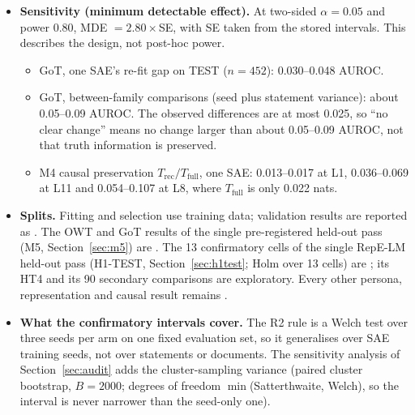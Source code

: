 \begin{itemize}
        excludes zero. No correction across cells is part of the rule; an approximate post-hoc Holm correction is
        reported alongside (Section~\ref{sec:pcacm}).
  \item \textbf{Sensitivity (minimum detectable effect).} At two-sided $\alpha=0.05$ and power 0.80,
        MDE $=2.80\times$SE, with SE taken from the stored intervals. This describes the design, not post-hoc power.
        \begin{itemize}
        \item GoT, one SAE's re-fit gap on TEST ($n=452$): 0.030--0.048 AUROC.
        \item GoT, between-family comparisons (seed plus statement variance): about 0.05--0.09 AUROC. The observed
          differences are at most 0.025, so ``no clear change'' means no change larger than about 0.05--0.09 AUROC,
          not that truth information is preserved.
        \item M4 causal preservation $T_{\text{rec}}/T_{\text{full}}$, one SAE: 0.013--0.017 at L1, 0.036--0.069 at
          L11 and 0.054--0.107 at L8, where $T_{\text{full}}$ is only 0.022 nats.
        \end{itemize}
  \item \textbf{Splits.} Fitting and selection use training data; validation results are reported as
        . The OWT and GoT results of the single pre-registered held-out pass (M5,
        Section~\ref{sec:m5}) are . The 13 confirmatory cells of the single RepE-LM held-out pass
        (H1-TEST, Section~\ref{sec:h1test}; Holm over 13 cells) are ; its HT4 and its 90 secondary
        comparisons are exploratory. Every other persona, representation and causal result remains
        .
  \item \textbf{What the confirmatory intervals cover.} The R2 rule is a Welch test over three seeds per arm on one
        fixed evaluation set, so it generalises over SAE training seeds, not over statements or documents. The
        sensitivity analysis of Section~\ref{sec:audit} adds the cluster-sampling variance (paired cluster bootstrap,
        $B=2000$; degrees of freedom $\min$(Satterthwaite, Welch), so the interval is never narrower than the seed-only
        one).
\end{itemize}
